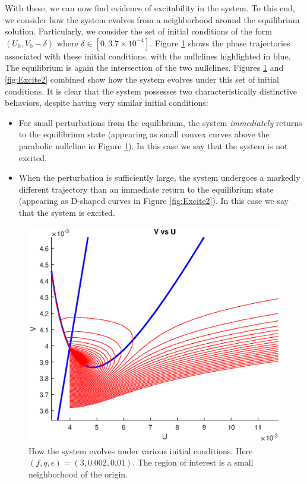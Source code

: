 \documentclass[twocolumn,amsmath,amssymb,aps]{revtex4}
\begin{document}
With these, we can now find evidence of excitability in the system. To this end, we consider how the system evolves from a neighborhood around the equilibrium solution. Particularly, we consider the set of initial conditions of the form $(U_0, V_0 - \delta)$ where $\delta \in [0, 3.7\times 10^{-4}]$. Figure \ref{fig:Excite1} shows the phase trajectories associated with these initial conditions, with the nullclines highlighted in blue. The equilibrium is again the intersection of the two nullclines. Figures \ref{fig:Excite1} and \ref{fig:Excite2} combined show how the system evolves under this set of initial conditions. It is clear that the system possesses two characteristically distinctive behaviors, despite having very similar initial conditions:
\begin{itemize}
	\item For small perturbations from the equilibrium, the system \textit{immediately} returns to the equilibrium state (appearing as small convex curves above the parabolic nullcline in Figure \ref{fig:Excite1}). In this case we say that the system is not excited.
	\item When the perturbation is sufficiently large, the system undergoes a markedly different trajectory than an immediate return to the equilibrium state (appearing as D-shaped curves in Figure \ref{fig:Excite2}). In this case we say that the system is excited.
\end{itemize}
\begin{figure}[!htb]
	\centering
	\includegraphics[scale=0.55]{excite_1.eps}
	\caption{How the system evolves under various initial conditions. Here $(f,q,\epsilon) = (3,0.002, 0.01)$. The region of interest is a small neighborhood of the origin.}
	\label{fig:Excite1}
\end{figure}
\end{document}
